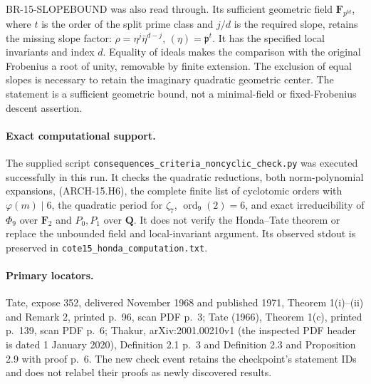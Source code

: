 BR-15-SLOPEBOUND was also read through. Its sufficient geometric field
\(\mathbf F_{p^{td}}\), where \(t\) is the order of the split prime
class and \(j/d\) is the required slope, retains the missing slope
factor: \(\rho=\eta^j\bar\eta^{d-j}\),
\((\eta)=\mathfrak p^t\). It has the specified local invariants and
index \(d\). Equality of ideals makes the comparison with the original
Frobenius a root of unity, removable by finite extension. The exclusion
of equal slopes is necessary to retain the imaginary quadratic
geometric center. The statement is a sufficient geometric bound, not a
minimal-field or fixed-Frobenius descent assertion.

\paragraph{Exact computational support.}
The supplied script
\nolinkurl{consequences_criteria_noncyclic_check.py} was executed
successfully in this run. It checks the quadratic reductions, both
norm-polynomial expansions, (ARCH-15.H6), the complete finite list of
cyclotomic orders with \(\varphi(m)\mid6\), the quadratic period for
\(\zeta_7\), \(\operatorname{ord}_9(2)=6\), and exact irreducibility
of \(\Phi_9\) over \(\mathbf F_2\) and \(P_0,P_1\) over
\(\mathbf Q\). It does not verify the Honda--Tate theorem or replace
the unbounded field and local-invariant argument. Its observed stdout
is preserved in \texttt{cote15\_honda\_computation.txt}.

\paragraph{Primary locators.}
Tate, expose 352, delivered November 1968 and published 1971,
Theorem 1(i)--(ii) and Remark 2, printed p.~96, scan PDF p.~3;
Tate (1966), Theorem 1(c), printed p.~139, scan PDF p.~6;
Thakur, arXiv:2001.00210v1 (the inspected PDF header is dated
1 January 2020), Definition 2.1 p.~3 and Definition 2.3 and
Proposition 2.9 with proof p.~6. The new check event retains the
checkpoint's statement IDs and does not relabel their proofs as newly
discovered results.
